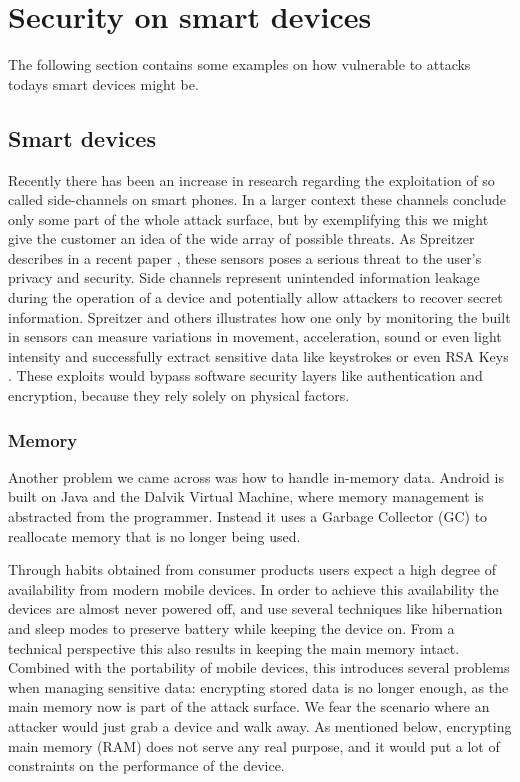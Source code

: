 \section{Security on smart devices}
\label{smartSecurity}

The following section contains some examples on how vulnerable to attacks todays smart devices might be. 

\subsection{Smart devices}
Recently there has been an increase in research regarding the exploitation of so called side-channels on smart phones. In a larger context these channels conclude only some part of the whole attack surface, but by exemplifying this we might give the customer an idea of the wide array of possible threats. As Spreitzer describes in a recent paper \cite{2014arXiv1405.3760S}, these sensors poses a serious threat to the user's privacy and security. Side channels represent unintended information leakage during the operation of a device and potentially allow attackers to recover secret information. Spreitzer and others illustrates how one only by monitoring the built in sensors can measure variations in movement, acceleration, sound or even light intensity and successfully extract sensitive data like keystrokes or even RSA Keys \cite{cryptoeprint:2013:857}. These exploits would bypass software security layers like authentication and encryption, because they rely solely on physical factors.

\subsubsection{Memory}
Another problem we came across was how to handle in-memory data. Android is built on Java and the Dalvik Virtual Machine, where memory management is abstracted from the programmer. Instead it uses a Garbage Collector (GC) to reallocate memory that is no longer being used.
 
Through habits obtained from consumer products users expect a high degree of availability from modern mobile devices. In order to achieve this availability the devices are almost never powered off, and use several techniques like hibernation and sleep modes to preserve battery while keeping the device on. From a technical perspective this also results in keeping the main memory intact. Combined with the portability of mobile devices, this introduces several problems when managing sensitive data: encrypting stored data is no longer enough, as the main memory now is part of the attack surface. We fear the scenario where an attacker would just grab a device and walk away. As mentioned below, encrypting main memory (RAM) does not serve any real purpose, and it would put a lot of constraints on the performance of the device.
 
